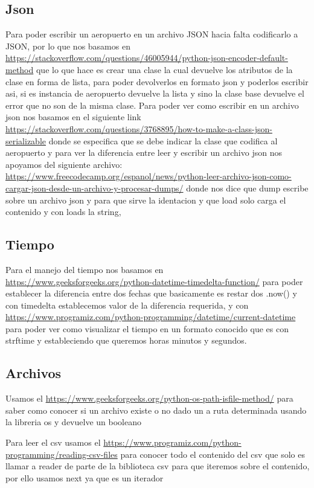 \documentclass[12pt]{article}
\begin{document}
\subsection{Json}

Para poder escribir un aeropuerto en un archivo JSON hacia falta codificarlo a JSON, por lo que nos basamos en \url{https://stackoverflow.com/questions/46005944/python-json-encoder-default-method} que lo que hace es crear una clase la cual devuelve los atributos de la clase en forma de lista, para poder devolverlos en formato json y poderlos escribir asi, si es instancia de aeropuerto devuelve la lista y sino la clase base devuelve el error que no son de la misma clase.
Para poder ver como escribir en un archivo json nos basamos en el siguiente link \url{https://stackoverflow.com/questions/3768895/how-to-make-a-class-json-serializable} donde se especifica que se debe indicar la clase que codifica al aeropuerto y para ver la diferencia entre leer y escribir un archivo json nos apoyamos del siguiente archivo: \url{https://www.freecodecamp.org/espanol/news/python-leer-archivo-json-como-cargar-json-desde-un-archivo-y-procesar-dumps/} donde nos dice que dump escribe sobre un archivo json y para que sirve la identacion y que load solo carga el contenido y con loads la string, 
\subsection{Tiempo}
Para el manejo del tiempo nos basamos en \url{https://www.geeksforgeeks.org/python-datetime-timedelta-function/} para poder establecer la diferencia entre dos fechas que basicamente es restar dos .now() y con timedelta establecemos valor de la diferencia requerida, y con \url{https://www.programiz.com/python-programming/datetime/current-datetime} para poder ver como visualizar el tiempo en un formato conocido que es con strftime y estableciendo que queremos horas minutos y segundos.
\subsection{Archivos}
Usamos el \url{https://www.geeksforgeeks.org/python-os-path-isfile-method/} para saber como conocer si un archivo existe o no dado un a ruta determinada usando la libreria os y devuelve un booleano

Para leer el csv usamos el \url{https://www.programiz.com/python-programming/reading-csv-files} para conocer todo el contenido del csv que solo es llamar a reader de parte de la biblioteca csv para que iteremos sobre el contenido, por ello usamos next ya que es un iterador
\end{document}
